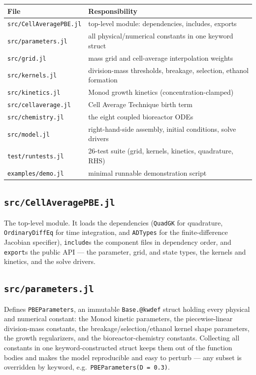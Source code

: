 \documentclass[11pt,a4paper]{article}
\begin{document}
\begin{center}
\begin{tabular}{@{}ll@{}}
\toprule
\textbf{File} & \textbf{Responsibility} \\
\midrule
\texttt{src/CellAveragePBE.jl} & top-level module: dependencies, includes, exports \\
\texttt{src/parameters.jl}  & all physical/numerical constants in one keyword struct \\
\texttt{src/grid.jl}        & mass grid and cell-average interpolation weights \\
\texttt{src/kernels.jl}     & division-mass thresholds, breakage, selection, ethanol formation \\
\texttt{src/kinetics.jl}    & Monod growth kinetics (concentration-clamped) \\
\texttt{src/cellaverage.jl} & Cell Average Technique birth term \\
\texttt{src/chemistry.jl}   & the eight coupled bioreactor ODEs \\
\texttt{src/model.jl}       & right-hand-side assembly, initial conditions, solve drivers \\
\texttt{test/runtests.jl}   & 26-test suite (grid, kernels, kinetics, quadrature, RHS) \\
\texttt{examples/demo.jl}   & minimal runnable demonstration script \\
\bottomrule
\end{tabular}
\end{center}

\subsection{\texttt{src/CellAveragePBE.jl}}
The top-level module. It loads the dependencies (\texttt{QuadGK} for quadrature, \texttt{OrdinaryDiffEq}
for time integration, and \texttt{ADTypes} for the finite-difference Jacobian specifier),
\texttt{include}s the component files in dependency order, and \texttt{export}s the public API --- the
parameter, grid, and state types, the kernels and kinetics, and the solve drivers.



\subsection{\texttt{src/parameters.jl}}
Defines \texttt{PBEParameters}, an immutable \texttt{Base.@kwdef} struct holding every physical and
numerical constant: the Monod kinetic parameters, the piecewise-linear division-mass constants, the
breakage/selection/ethanol kernel shape parameters, the growth regularizers, and the bioreactor-chemistry
constants. Collecting all constants in one keyword-constructed struct keeps them out of the function
bodies and makes the model reproducible and easy to perturb --- any subset
is overridden by keyword, e.g.\ \texttt{PBEParameters(D = 0.3)}.
\end{document}
